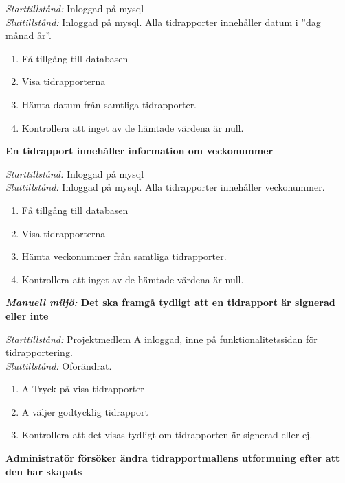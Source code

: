 \documentclass[a4paper]{article}
\begin{document}
\begin{FT}
\emph{Starttillstånd:} Inloggad på mysql\\
\emph{Sluttillstånd:} Inloggad på mysql. Alla tidrapporter innehåller datum i ''dag månad år''.\\

\begin{enumerate}
\item Få tillgång till databasen
\item Visa tidrapporterna
\item Hämta datum från samtliga tidrapporter.
\item Kontrollera att inget av de hämtade värdena är null.
\end{enumerate}


\item
\textbf{En tidrapport innehåller information om veckonummer}

\emph{Starttillstånd:} Inloggad på mysql\\
\emph{Sluttillstånd:} Inloggad på mysql. Alla tidrapporter innehåller veckonummer.\\

\begin{enumerate}
\item Få tillgång till databasen
\item Visa tidrapporterna
\item Hämta veckonummer från samtliga tidrapporter.
\item Kontrollera att inget av de hämtade värdena är null.
\end{enumerate}


\item
\textbf{\emph{Manuell miljö:} Det ska framgå tydligt att en tidrapport är signerad eller inte}

\emph{Starttillstånd:} Projektmedlem A inloggad, inne på funktionalitetssidan för tidrapportering.\\
\emph{Sluttillstånd:} Oförändrat.

\begin{enumerate}
\item A Tryck på visa tidrapporter
\item A väljer godtycklig tidrapport
\item Kontrollera att det visas tydligt om tidrapporten är signerad eller ej.
\end{enumerate}


\item
\textbf{Administratör försöker ändra tidrapportmallens utformning efter att den har
skapats}


\end{FT}
\end{document}
